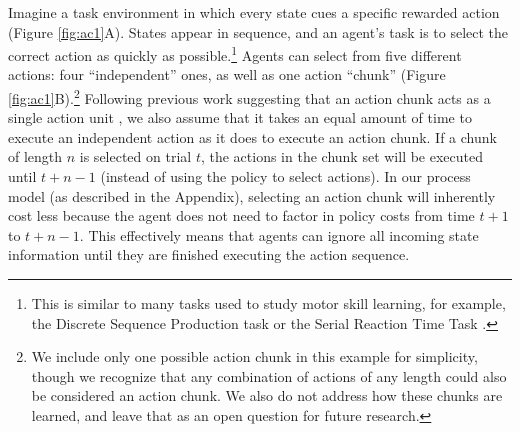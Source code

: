 \documentclass[11pt]{article}
\begin{document}
Imagine a task environment in which every state cues a specific rewarded action (Figure \ref{fig:ac1}A). States appear in sequence, and an agent's task is to select the correct action as quickly as possible.\footnote{This is similar to many tasks used to study motor skill learning, for example, the Discrete Sequence Production task \citep{Verwey1999-fn} or the Serial Reaction Time Task \citep{Nissen1987-vn,Robertson2007-pv}.} Agents can select from five different actions: four ``independent'' ones, as well as one action ``chunk'' (Figure \ref{fig:ac1}B).\footnote{We include only one possible action chunk in this example for simplicity, though we recognize that any combination of actions of any length could also be considered an action chunk. We also do not address how these chunks are learned, and leave that as an open question for future research.} Following previous work suggesting that an action chunk acts as a single action unit \citep{graybiel98,sakai03}, we also assume that it takes an equal amount of time to execute an independent action as it does to execute an action chunk. If a chunk of length $n$ is selected on trial $t$, the actions in the chunk set will be executed until $t+n-1$ (instead of using the policy to select actions). In our process model (as described in the Appendix), selecting an action chunk will inherently cost less because the agent does not need to factor in policy costs from time $t+1$ to $t+n-1$. This effectively means that agents can ignore all incoming state information until they are finished executing the action sequence. 
\end{document}
